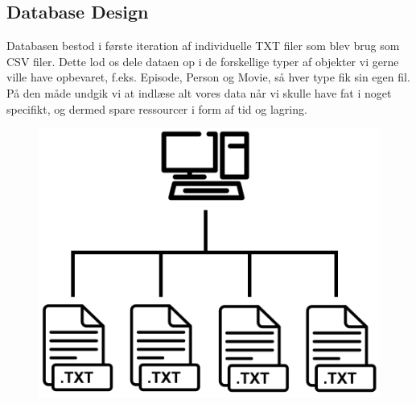 \newpage
\subsection{Database Design}
Databasen bestod i første iteration af individuelle TXT filer som blev brug som CSV filer. Dette lod os dele dataen op i de forskellige typer af objekter vi gerne ville have opbevaret, f.eks. Episode, Person og Movie, så hver type fik sin egen fil. På den måde undgik vi at indlæse alt vores data når vi skulle have fat i noget specifikt, og dermed spare ressourcer i form af tid og lagring.

\begin{figure}[H]
    \centering
\includegraphics[scale = 0.7]{images/computer_to_txt_file_icon.png}
\end{figure}

